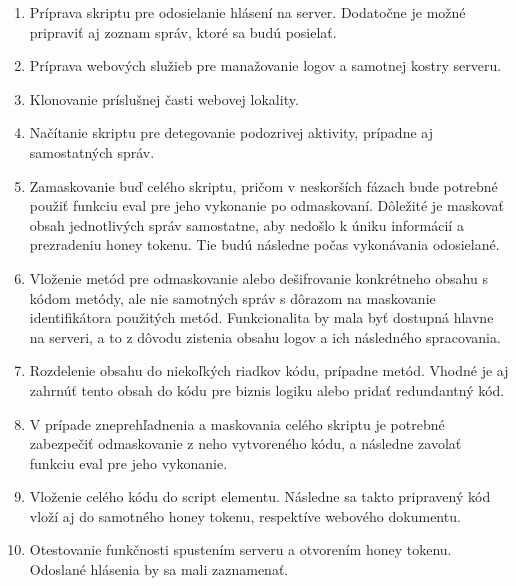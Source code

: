 \documentclass[conference, 11pt,slovak,a4paper,twoside]{IEEEtran}
\begin{document}
\begin{enumerate}
	\item Príprava skriptu pre odosielanie hlásení na server. Dodatočne je možné pripraviť aj zoznam správ, ktoré sa budú posielať.

	\item Príprava webových služieb pre manažovanie logov a samotnej kostry serveru.
	
	\item Klonovanie príslušnej časti webovej lokality.
	
	\item Načítanie skriptu pre detegovanie podozrivej aktivity, prípadne aj samostatných správ. 
	
	\item Zamaskovanie buď celého skriptu, pričom v neskorších fázach bude potrebné použiť funkciu eval pre jeho vykonanie po odmaskovaní. Dôležité je maskovať obsah jednotlivých správ samostatne, aby nedošlo k úniku informácií a prezradeniu honey tokenu. Tie budú následne počas vykonávania odosielané. 
	
	\item Vloženie metód pre odmaskovanie alebo dešifrovanie konkrétneho obsahu s kódom metódy, ale nie samotných správ s dôrazom na maskovanie identifikátora použitých metód. Funkcionalita by mala byť dostupná hlavne na serveri, a to z dôvodu zistenia obsahu logov a ich následného spracovania.
	
	\item Rozdelenie obsahu do niekoľkých riadkov kódu, prípadne metód. Vhodné je aj zahrnúť tento obsah do kódu pre biznis logiku alebo pridať redundantný kód.
	
	\item V prípade zneprehľadnenia a maskovania celého skriptu je potrebné zabezpečiť odmaskovanie z neho vytvoreného kódu, a následne zavolať funkciu eval pre jeho vykonanie.
	
	\item Vloženie celého kódu do script elementu. Následne sa takto pripravený kód vloží aj do samotného honey tokenu, respektíve webového dokumentu.
	
	\item Otestovanie funkčnosti spustením serveru a otvorením honey tokenu. Odoslané hlásenia by sa mali zaznamenať.
\end{enumerate}
\end{document}
